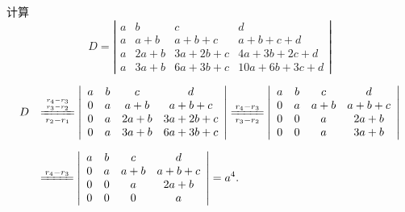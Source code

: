 \begin{frame}
\begin{testexample}
  计算
  $$
  D = \left |
    \begin{array}{cccc}
      a &    b &       c &           d  \\
      a &  a+b &   a+b+c &     a+b+c+d  \\
      a & 2a+b & 3a+2b+c &  4a+3b+2c+d  \\
      a & 3a+b & 6a+3b+c & 10a+6b+3c+d   
    \end{array}
  \right|
  $$
\end{testexample}\pause 

\begin{jie}
  $$
  \begin{array}{ll}
    D &  \ds \xlongequal[r_2-r_1]{r_4-r_3\atop r_3-r_2}
        \left |
        \begin{array}{cccc}
          a &    b &     c &         d  \\
          0 &    a &   a+b &     a+b+c  \\
          0 &    a &  2a+b &   3a+2b+c  \\
          0 &    a &  3a+b &   6a+3b+c   
        \end{array}\right| \xlongequal[r_3-r_2]{r_4-r_3}\left |
                             \begin{array}{cccc}
                               a &    b &     c &         d  \\
                               0 &    a &   a+b &     a+b+c  \\
                               0 &    0 &     a &      2a+b  \\
                               0 &    0 &     a &      3a+b   
                             \end{array}
                                                  \right|
    \\[1.0cm]
      &  \ds \xlongequal{r_4-r_3} \left |
        \begin{array}{cccc}
          a &    b &     c &         d  \\
          0 &    a &   a+b &     a+b+c  \\
          0 &    0 &     a &      2a+b  \\
          0 &    0 &     0 &         a   
        \end{array}
                             \right| = a^4.      
  \end{array}
  $$
\end{jie}
%
\end{frame}

